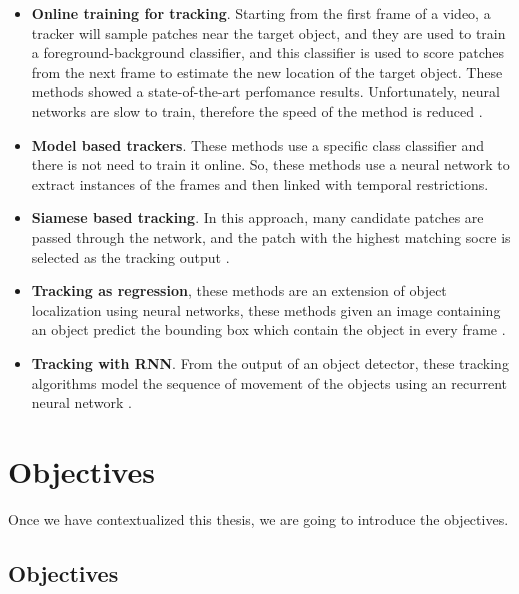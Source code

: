 \documentclass[12pt, a4paper, titlepage,twoside,openright]{article}
\begin{document}
\begin{itemize}


\item \textbf{Online training for tracking}. Starting from the first frame of a video, a tracker will sample patches near the target object, and they are used to train a foreground-background  classifier, and this classifier is used to score patches from the next frame to estimate the new location of the target object. These methods showed a state-of-the-art perfomance results. Unfortunately, neural networks are slow to train, therefore the speed of the method is reduced \cite{deep1} \cite{deep2}.

\item \textbf{Model based trackers}. These methods use a specific class classifier and there is not need to train it online. So, these methods use a neural network to extract instances of the frames and then linked with temporal restrictions. 


\item \textbf{Siamese based tracking}. In this approach, many candidate patches are passed through the network, and the patch with the highest matching socre is selected as the tracking output \cite{trackingSiamese}.


\item \textbf{Tracking as regression}, these methods are an extension of object localization using neural networks, these methods given an image containing an object predict the bounding box which contain the object in every frame \cite{thrun}.


\item \textbf{Tracking with RNN}. From the output of an object detector, these tracking algorithms model the sequence of movement of the objects using an recurrent neural network \cite{savaresee}.


\end{itemize}



\section{Objectives}

Once we have contextualized this thesis, we are going to introduce the objectives.

\subsection{Objectives}
\end{document}
